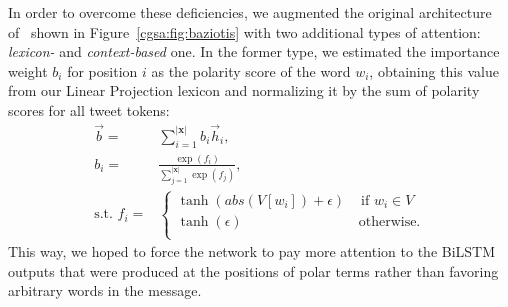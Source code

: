 In order to overcome these deficiencies, we augmented the original
architecture of~\citet{Baziotis:17} shown in
Figure~\ref{cgsa:fig:baziotis} with two additional types of attention:
\emph{lexicon-} and \emph{context-based} one.  In the former type, we
estimated the importance weight $b_i$ for position $i$ as the polarity
score of the word $w_i$, obtaining this value from our Linear
Projection lexicon and normalizing it by the sum of polarity scores
for all tweet tokens:
\begin{align*}
  \vec{b} =& \sum_{i=1}^{|\mathbf{x}|}b_i\vec{h}_i,\\
  b_i =& \frac{\exp(f_i)}{\sum_{j=1}^{|\mathbf{x}|}\exp(f_j)},\\
  \mbox{s.t. }f_i
  =& \left\{
  \begin{array}{ll}
    \tanh(abs(V[{w_i}]) + \epsilon) & \textrm{ if } w_i\in V\\
    \tanh(\epsilon) & \, \textrm{otherwise.} \\
  \end{array}
  \right.
\end{align*}\label{cgsa:eq:lba}%
This way, we hoped to force the network to pay more attention to the
BiLSTM outputs that were produced at the positions of polar terms
rather than favoring arbitrary words in the message.

